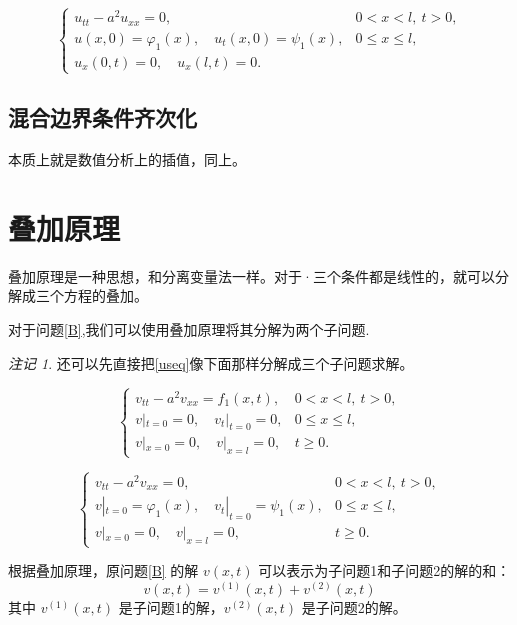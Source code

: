 \documentclass[12pt,a4paper]{article}
\numberwithin{subsection}{section}   %
\numberwithin{subsubsection}{subsection}
\theoremstyle{plain}
\theoremstyle{definition}
\theoremstyle{remark}
\newtheorem{remark}[theorem]{注记}
\theoremstyle{remark}
\begin{document}
		\begin{equation}
			\begin{cases}
				u_{tt} - a^2 u_{xx} = 0, & 0 < x < l, \ t > 0, \\
				u(x, 0) = \varphi_1(x), \quad u_t(x, 0) = \psi_1(x), & 0 \leq x \leq l, \\
				u_x(0, t) = 0, \quad u_x(l, t) = 0. &
			\end{cases}
		\end{equation}
		
	\subsection{混合边界条件齐次化}
	本质上就是数值分析上的插值，同上。
	
	
	
	
	
		\newpage
	\section{叠加原理}
	叠加原理是一种思想，和分离变量法一样。对于·三个条件都是线性的，就可以分解成三个方程的叠加。
	
	
	对于问题\eqref{B},我们可以使用叠加原理将其分解为两个子问题.
	\begin{remark}
	还可以先直接把\eqref{useq}像下面那样分解成三个子问题求解。
	\end{remark}
	\begin{equation}
		\begin{cases}
			v_{tt} - a^2 v_{xx} = f_1(x, t), & 0 < x < l, \ t > 0, \\
			v|_{t=0} = 0, \quad v_t|_{t=0} = 0, & 0 \leq x \leq l, \\
			v|_{x=0} = 0, \quad v|_{x=l} = 0, & t \geq 0.
		\end{cases}
	\end{equation}
	
	\begin{equation}\label{f}
		\begin{cases}
			v_{tt} - a^2 v_{xx} = 0, & 0 < x < l, \ t > 0, \\
			v|_{t=0} = \varphi_1(x), \quad v_t|_{t=0} = \psi_1(x), & 0 \leq x \leq l, \\
			v|_{x=0} = 0, \quad v|_{x=l} = 0, & t \geq 0.
		\end{cases}
	\end{equation}
	
	
	根据叠加原理，原问题\eqref{B}  的解 \(v(x, t)\) 可以表示为子问题1和子问题2的解的和：
	\begin{equation}
		v(x, t) = v^{(1)}(x, t) + v^{(2)}(x, t)
	\end{equation}
	其中 \(v^{(1)}(x, t)\) 是子问题1的解，\(v^{(2)}(x, t)\) 是子问题2的解。
	
\end{document}
